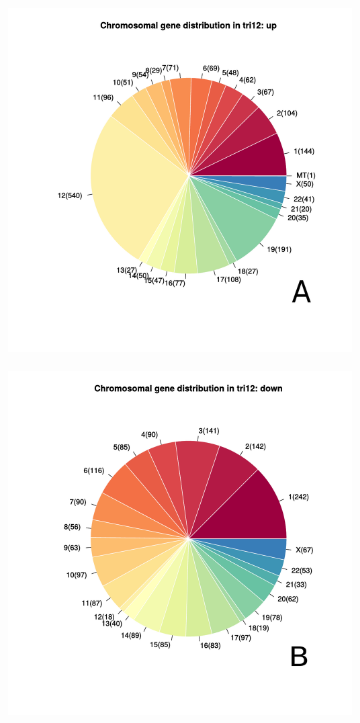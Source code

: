 \begin{figure}
	\centering
	\begin{subfigure}[t]{0.48\columnwidth}
		\includegraphics[width=\columnwidth]{./Figures/chromosom_dist_up.pdf}
		\subcaption*{}
		\label{fig:tri12_chrom_dn}
	\end{subfigure}
	\hfill
	\begin{subfigure}[t]{0.48\columnwidth}
		\includegraphics[width=\columnwidth]{./Figures/chromosom_dist_down.pdf}

\end{subfigure}
\end{figure}
